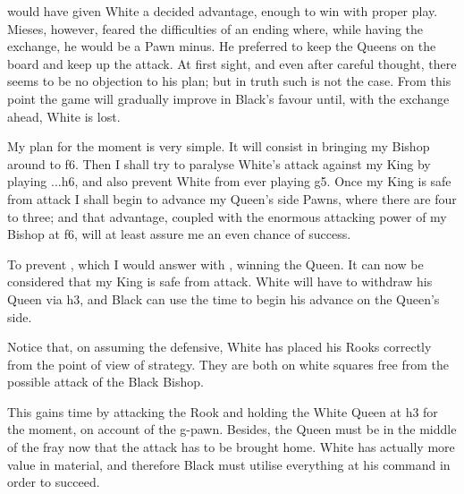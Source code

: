\documentclass[10pt,twoside]{article}
\begin{document}

\board


 would have given White a decided advantage, enough to win with proper play. Mieses, however, feared the difficulties of an ending where, while having the exchange, he would be a Pawn minus. He preferred to keep the Queens on the board and keep up the attack. At first sight, and even after careful thought, there seems to be no objection to his plan; but in truth such is not the case. From this point the game will gradually improve in Black's favour until, with the exchange ahead, White is lost.


\board

My plan for the moment is very simple. It will consist in bringing my Bishop around to f6. Then I shall try to paralyse White's attack against my King by playing ...h6, and also prevent White from ever playing g5. Once my King is safe from attack I shall begin to advance my Queen's side Pawns, where there are four to three; and that advantage, coupled with the enormous attacking power of my Bishop at f6, will at least assure me an even chance of success.


To prevent , which I would answer with , winning the Queen. It can now be considered that my King is safe from attack. White will have to withdraw his Queen via h3, and Black can use the time to begin his advance on the Queen's side.


Notice that, on assuming the defensive, White has placed his Rooks correctly from the point of view of strategy. They are both on white squares free from the possible attack of the Black Bishop.


This gains time by attacking the Rook and holding the White Queen at h3 for the moment, on account of the g-pawn. Besides, the Queen must be in the middle of the fray now that the attack has to be brought home. White has actually more value in material, and therefore Black must utilise everything at his command in order to succeed.

\end{document}
